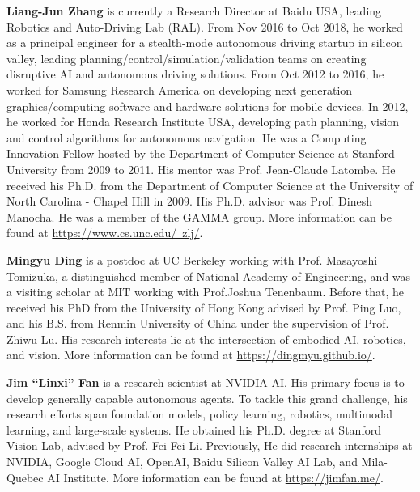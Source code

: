 \documentclass[10pt]{article} %
\begin{document}
\textbf{Liang-Jun Zhang} is currently a Research Director at Baidu USA, leading Robotics and Auto-Driving Lab (RAL). From Nov 2016 to Oct 2018, he worked as a principal engineer for a stealth-mode autonomous driving startup in silicon valley, leading planning/control/simulation/validation teams on creating disruptive AI and autonomous driving solutions. From Oct 2012 to 2016, he worked for Samsung Research America on developing next generation graphics/computing software and hardware solutions for mobile devices. In 2012, he worked for Honda Research Institute USA, developing path planning, vision and control algorithms for autonomous navigation. He was a Computing Innovation Fellow hosted by the Department of Computer Science at Stanford University from 2009 to 2011. His mentor was Prof. Jean-Claude Latombe. He received his Ph.D. from the Department of Computer Science at the University of North Carolina - Chapel Hill in 2009. His Ph.D. advisor was Prof. Dinesh Manocha. He was a member of the GAMMA group. More information can be found at \href{https://www.cs.unc.edu/~zlj/}{https://www.cs.unc.edu/~zlj/}.


\textbf{Mingyu Ding} is a postdoc at UC Berkeley working with Prof. Masayoshi Tomizuka, a distinguished member of National Academy of Engineering, and was a visiting scholar at MIT working with Prof.Joshua Tenenbaum. Before that, he received his PhD from the University of Hong Kong advised by Prof. Ping Luo, and his B.S. from Renmin University of China under the supervision of Prof. Zhiwu Lu. His research interests lie at the intersection of embodied AI, robotics, and vision. More information can be found at \href{https://dingmyu.github.io/}{https://dingmyu.github.io/}.


\textbf{Jim ``Linxi'' Fan} is a research scientist at NVIDIA AI. His primary focus is to develop generally capable autonomous agents. To tackle this grand challenge, his research efforts span foundation models, policy learning, robotics, multimodal learning, and large-scale systems. He obtained his Ph.D. degree at Stanford Vision Lab, advised by Prof. Fei-Fei Li. Previously, He did research internships at NVIDIA, Google Cloud AI, OpenAI, Baidu Silicon Valley AI Lab, and Mila-Quebec AI Institute. More information can be found at \href{https://jimfan.me/}{https://jimfan.me/}.  
\end{document}
